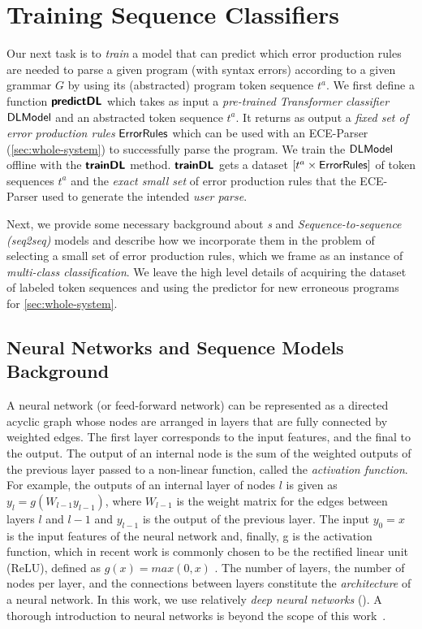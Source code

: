 \section{Training Sequence Classifiers}
\label{sec:seq-classifiers}

Our next task is to \emph{train} a model that can predict which error production
rules are needed to parse a given program (with syntax errors) according to a
given grammar $G$ by using its (abstracted) program token sequence $t^a$.
%
We first define a function $\bm{\mathsf{predictDL}}$ which takes as input a
\emph{pre-trained Transformer classifier} $\mathsf{DLModel}$ and an abstracted token
sequence $t^a$.
%
It returns as output a \emph{fixed set of error production rules}
$\mathsf{ErrorRules}$ which can be used with an ECE-Parser
(\autoref{sec:whole-system}) to successfully parse the program.
%
We train the $\mathsf{DLModel}$ offline with the $\bm{\mathsf{trainDL}}$ method. $\bm{\mathsf{trainDL}}$ gets
a dataset $[t^a \times \mathsf{ErrorRules}]$ of token sequences $t^a$ and the
\emph{exact small set} of error production rules that the ECE-Parser used to
generate the intended \emph{user parse}.

Next, we provide some necessary background about \emph{\dnn{}s} and
\emph{Sequence-to-sequence (seq2seq)} models and describe how we incorporate
them in the problem of selecting a small set of error production rules, which we
frame as an instance of \emph{multi-class classification}. We leave the high
level details of acquiring the dataset of labeled token sequences and using the
predictor for new erroneous programs for \autoref{sec:whole-system}.

\subsection{Neural Networks and Sequence Models Background}
\label{sec:seq-classifiers:background}

A neural network (or feed-forward network) can be represented as a directed
acyclic graph whose nodes are arranged in layers that are fully connected by
weighted edges. The first layer corresponds to the input features, and the final
to the output. The output of an internal node is the sum of the weighted outputs
of the previous layer passed to a non-linear function, called the
\emph{activation function}. For example, the outputs of an internal layer of
nodes $l$ is given as $y_l = g(W_{l-1} y_{l-1})$, where $W_{l-1}$ is the weight
matrix for the edges between layers $l$ and $l-1$ and $y_{l-1}$ is the output of
the previous layer. The input $y_0 = x$ is the input features of the neural
network and, finally, g is the activation function, which in recent work is
commonly chosen to be the rectified linear unit (ReLU), defined as $g(x) =
max(0, x)$ \citep{Nair2010-xg}.  The number of layers, the number of nodes per
layer, and the connections between layers constitute the \emph{architecture} of
a neural network. In this work, we use relatively \emph{deep neural networks}
(\dnn). A thorough introduction to neural networks is beyond the scope of this
work~\citep{Hastie2009-bn, Nielsen2015-pu}.

